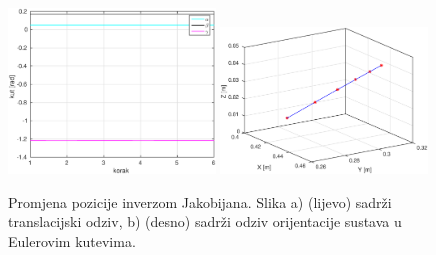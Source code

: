 \documentclass[times, utf8, diplomski, numeric]{fer}
\begin{document}
\begin{figure}[h!]
\centering
\includegraphics[width=0.49\textwidth]{matlab_pravocrtno1_kut}
\includegraphics[width=0.49\textwidth]{matlab_pravocrtno1}
\caption{Promjena pozicije inverzom Jakobijana.
Slika a) (lijevo) sadrži translacijski odziv, b) (desno) sadrži odziv orijentacije sustava u Eulerovim kutevima.} \label{P1}
\end{figure}
\end{document}
